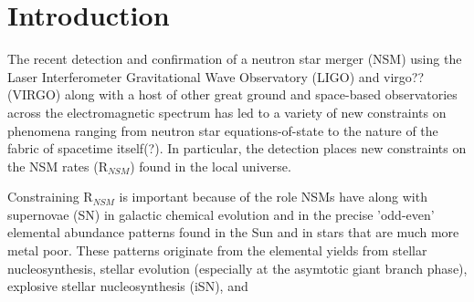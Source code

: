 \section{Introduction}
\label{intro} 
The recent detection and confirmation of a neutron star merger (NSM) using the Laser Interferometer Gravitational Wave Observatory (LIGO) and virgo?? (VIRGO) along with a host of other great ground and space-based observatories across the electromagnetic spectrum has led to a variety of new constraints on phenomena ranging from neutron star equations-of-state to the nature of the fabric of spacetime itself(?). In particular, the detection places new constraints on the NSM rates (R$_{NSM}$) found in the local universe. 

Constraining R$_{NSM}$ is important because of the role NSMs have along with supernovae (SN) in galactic chemical evolution and in the precise 'odd-even' elemental abundance patterns found in the Sun and in stars that are much more metal poor. These patterns originate from the elemental yields from stellar nucleosynthesis, stellar evolution (especially at the asymtotic giant branch phase), explosive stellar nucleosynthesis (iSN), and 

